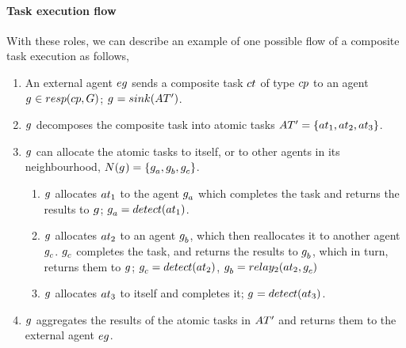 \paragraph{Task execution flow}
With these roles, we can describe an example of one possible flow of a composite task execution as follows,
\begin{enumerate}
	\item An external agent $\varExternalAgent{}{}$ sends a composite task $\varCompositeTask{}{}$ of type $\varCompositeTaskType{}{}$ to an agent $\varAgent{}{} \in \functionTaskResponsibilities{}{}$; $\varAgent{}{} = \functionSinkRole{}{}$.
	
	\item $g_{}^{}$ decomposes the composite task into atomic tasks $\setAtomicTaskInstance{}{} = \lbrace \varAtomicTask{1}{}, \varAtomicTask{2}{}, \varAtomicTask{3}{} \rbrace$.
	
	\item $g_{}^{}$ can allocate the atomic tasks to itself, or to other agents in its neighbourhood, $\functionNeighbourhoodSignature{}{} = \lbrace \varAgent{a}{}, \varAgent{b}{}, \varAgent{c}{} \rbrace$.
	\begin{enumerate}
		\item $g_{}^{}$ allocates $\varAtomicTask{1}{}$ to the agent $g_{a}^{}$ which completes the task and returns the results to $g_{}^{}$; $\varAgent{a}{} = \functionDetectorRole{1}{}$.
		\item $g_{}^{}$ allocates $\varAtomicTask{2}{}$ to an agent $g_{b}^{}$, which then reallocates it to another agent $g_{c}^{}$. $g_{c}^{}$ completes the task, and returns the results  to $g_{b}^{}$, which in turn, returns them to $g_{}^{}$; $\varAgent{c}{} = \functionDetectorRole{2}{}$, $\varAgent{b}{} = \functionRelayRole{2}{2}{c}$
		\item $g_{}^{}$ allocates $\varAtomicTask{3}{}$ to itself and completes it; $\varAgent{}{} = \functionDetectorRole{3}{}$.
	\end{enumerate}
	
	\item $g_{}^{}$ aggregates the results of the atomic tasks in $\setAtomicTaskInstance{}{}$ and returns them to the external agent $\varExternalAgent{}{}$.
\end{enumerate}

